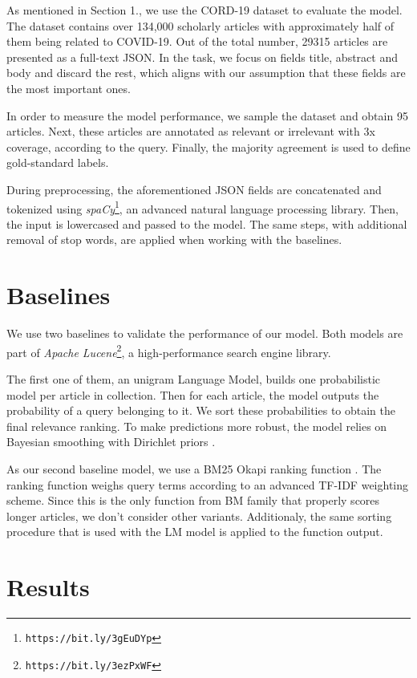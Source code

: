 \documentclass[10pt, a4paper]{article}
\begin{document}
As mentioned in Section 1., we use the CORD-19 dataset to evaluate the model. The dataset contains over 134,000 scholarly articles with approximately half of them being related to COVID-19. Out of the total number, 29315 articles are presented as a full-text JSON. In the task, we focus on fields title, abstract and body and discard the rest, which aligns with our assumption that these fields are the most important ones.

In order to measure the model performance, we sample the dataset and obtain 95 articles. Next, these articles are annotated as relevant or irrelevant with 3x coverage, according to the query. Finally, the majority agreement is used to define gold-standard labels.  

During preprocessing, the aforementioned JSON fields are concatenated and tokenized using \emph{spaCy}\footnote{\texttt{https://bit.ly/3gEuDYp}}, an advanced natural language processing library. Then, the input is lowercased and passed to the model. The same steps, with additional removal of stop words, are applied when working with the baselines.

\section{Baselines}

We use two baselines to validate the performance of our model. Both models are part of \emph{Apache Lucene}\footnote{\texttt{https://bit.ly/3ezPxWF}}, a high-performance search engine library.

The first one of them, an unigram Language Model, builds one probabilistic model per article in collection. Then for each article, the model outputs the probability of a query belonging to it. We sort these probabilities to obtain the final relevance ranking. To make predictions more robust, the model relies on Bayesian smoothing with Dirichlet priors \citep{zhai2004study}.

As our second baseline model, we use a BM25 Okapi ranking function \citep{robertson1995okapi}. The ranking function weighs query terms according to an advanced TF-IDF weighting scheme. Since this is the only function from BM family that properly scores longer articles, we don't consider other variants. Additionaly, the same sorting procedure that is used with the LM model is applied to the function output. 

\section{Results}
\end{document}
